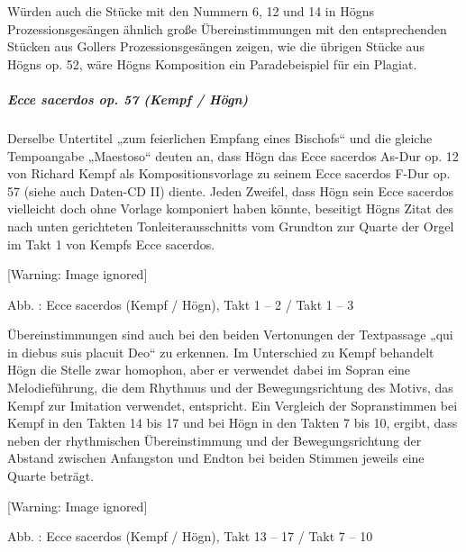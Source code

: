\documentclass[a4paper]{article}
\newcounter{Abb}
\renewcommand\theAbb{\arabic{Abb}}
\begin{document}
Würden auch die Stücke mit den Nummern 6, 12 und 14 in Högns
Prozessionsgesängen ähnlich große Übereinstimmungen mit den
entsprechenden Stücken aus Gollers Prozessionsgesängen zeigen, wie die
übrigen Stücke aus Högns op. 52, wäre Högns Komposition ein
Paradebeispiel für ein Plagiat. 

\subparagraph[Ecce sacerdos op. 57 (Kempf / Högn)]{Ecce sacerdos op. 57
(Kempf / Högn)}
Derselbe Untertitel „zum feierlichen Empfang eines Bischofs“ und die
gleiche Tempoangabe „Maestoso“ deuten an, dass Högn das Ecce sacerdos
As-Dur op. 12 von Richard Kempf als Kompositionsvorlage zu seinem Ecce
sacerdos F-Dur op. 57 (siehe auch Daten-CD II) diente. Jeden Zweifel,
dass Högn sein Ecce sacerdos vielleicht doch ohne Vorlage komponiert
haben könnte, beseitigt Högns Zitat des nach unten gerichteten
Tonleiterausschnitts vom Grundton zur Quarte der Orgel im Takt 1 von
Kempfs Ecce sacerdos. 

  [Warning: Image ignored] %
 

Abb. \stepcounter{Abb}{\theAbb}: Ecce sacerdos (Kempf / Högn), Takt 1 –
2  / Takt 1 – 3

Übereinstimmungen sind auch bei den beiden Vertonungen der Textpassage
„qui in diebus suis placuit Deo“ zu erkennen. Im Unterschied zu Kempf
behandelt Högn die Stelle zwar homophon, aber er verwendet dabei im
Sopran eine Melodieführung, die dem Rhythmus und der Bewegungsrichtung
des Motivs, das Kempf zur Imitation verwendet, entspricht. Ein
Vergleich der Sopranstimmen bei Kempf in den Takten 14 bis 17 und bei
Högn in den Takten 7 bis 10, ergibt, dass neben der rhythmischen
Übereinstimmung und der Bewegungsrichtung der Abstand zwischen
Anfangston und Endton bei beiden Stimmen jeweils eine Quarte beträgt. 

  [Warning: Image ignored] %
 

Abb. \stepcounter{Abb}{\theAbb}: Ecce sacerdos (Kempf / Högn), Takt 13 –
17 / Takt 7 – 10
\end{document}
